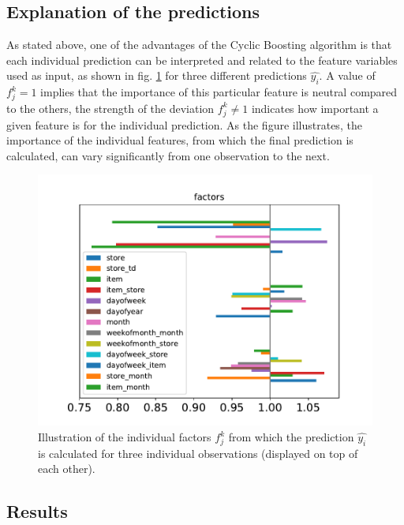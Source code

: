 \documentclass[BCOR=1mm, DIV=calc,10pt,
twoside=true,
twocolumn,
headings=normal]{scrartcl}
\begin{document}
\subsection{Explanation of the predictions}

As stated above, one of the advantages of the Cyclic Boosting algorithm is that each
individual prediction can be interpreted and related to the feature variables used as
input, as shown in fig. \ref{fig:factors} for three different predictions $\hat{y_i}$. A
value of $f^k_j = 1$ implies that the importance of this particular feature is neutral
compared to the others, the strength of the deviation $f^k_j \neq 1$ indicates how
important a given feature is for the individual prediction. As the figure illustrates, the
importance of the individual features, from which the final prediction is calculated, can
vary significantly from one observation to the next.

\begin{figure}
\begin{center}
\includegraphics[scale=0.55]{factors}
\caption{\label{fig:factors} Illustration of the individual factors $f^k_j$ from which
the prediction $\hat{y_i}$ is calculated for three individual observations (displayed on
top of each other).}
\end{center}
\end{figure}


\subsection{Results}
\end{document}
